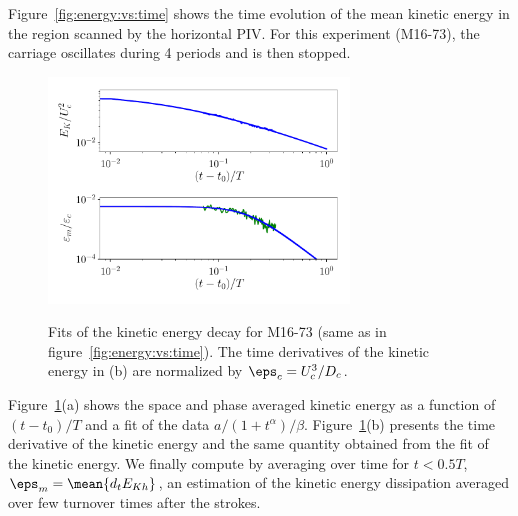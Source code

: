 Figure~\ref{fig:energy:vs:time} shows the time evolution of the mean kinetic
energy in the region scanned by the horizontal PIV. For this experiment
(M16-73), the carriage oscillates during 4 periods and is then stopped.

\begin{figure}
\includegraphics[width=80mm]{tmp/fig_fit_EK}
\label{fig:fit:EK}

\caption{Fits of the kinetic energy decay for M16-73 (same as in
figure~\ref{fig:energy:vs:time}). The time derivatives of the kinetic energy in
(b) are normalized by $\eps_c = U_c^3 / D_c$.}

\end{figure}

Figure~\ref{fig:fit:EK}(a) shows the space and phase averaged kinetic energy as
a function of $(t - t_0)/T$ and a fit of the data $a / (1 + t^\alpha)/\beta$.
Figure~\ref{fig:fit:EK}(b) presents the time derivative of the kinetic energy
and the same quantity obtained from the fit of the kinetic energy. We finally
compute by averaging over time for $t < 0.5 T$, $\eps_m= \mean{d_t E_{Kh}}$, an
estimation of the kinetic energy dissipation averaged over few turnover times
after the strokes.

